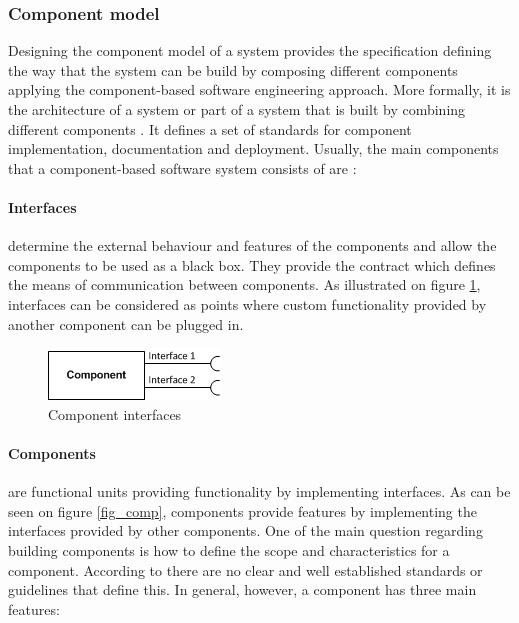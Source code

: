 \subsubsection{Component model}

Designing the component model of a system provides the specification defining the way that the system can be build by composing different components applying the component-based software engineering approach. More formally, it is the architecture of a system or part of a system that is built by combining different components \cite{cai2000component}. It defines a set of  standards for component implementation, documentation and deployment. Usually, the main components that a component-based software system consists of are \cite{chen2009refinement}:

\paragraph{Interfaces}
	determine the external behaviour and features of the components and allow the components to be used as a black box. They provide the contract which defines the means of communication between components. As illustrated on figure \ref{fig_intf}, interfaces can be considered as points where custom functionality provided by another component can be plugged in. 
	
	\begin{figure}[h!]
  		\centering
  		\includegraphics[scale=0.75]{plug-in/component-interfaces.png}
  		\caption{Component interfaces }
  		\label{fig_intf}
	\end{figure}

\paragraph{Components}
	are functional units providing functionality by implementing interfaces. As can be seen on figure \ref{fig_comp}, components provide  features by implementing the interfaces provided by other components. One of the main question regarding building components is how to define the scope and characteristics for a component. According to \cite{cai2000component} there are no clear and well established standards or guidelines that define this. In general, however, a component has three main features: 

